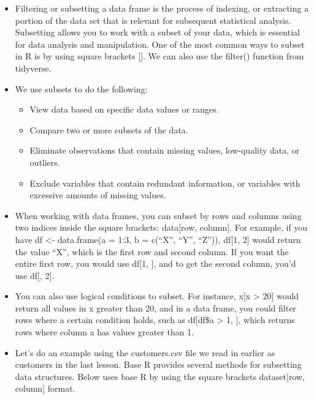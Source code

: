 \documentclass[
  letterpaper,
  DIV=11,
  numbers=noendperiod]{scrreprt}
\providecommand{\tightlist}{%
  \setlength{\itemsep}{0pt}\setlength{\parskip}{0pt}}\usepackage{longtable,booktabs,array}
\begin{document}
\begin{itemize}
\item
  Filtering or subsetting a data frame is the process of indexing, or
  extracting a portion of the data set that is relevant for subsequent
  statistical analysis. Subsetting allows you to work with a subset of
  your data, which is essential for data analysis and manipulation. One
  of the most common ways to subset in R is by using square brackets
  {[}{]}. We can also use the filter() function from tidyverse.
\item
  We use subsets to do the following:

  \begin{itemize}
  \tightlist
  \item
    View data based on specific data values or ranges.
  \item
    Compare two or more subsets of the data.
  \item
    Eliminate observations that contain missing values, low-quality
    data, or outliers.
  \item
    Exclude variables that contain redundant information, or variables
    with excessive amounts of missing values.
  \end{itemize}
\item
  When working with data frames, you can subset by rows and columns
  using two indices inside the square brackets: data{[}row, column{]}.
  For example, if you have df \textless- data.frame(a = 1:3, b =
  c(``X'', ``Y'', ``Z'')), df{[}1, 2{]} would return the value ``X'',
  which is the first row and second column. If you want the entire first
  row, you would use df{[}1, {]}, and to get the second column, you'd
  use df{[}, 2{]}.
\item
  You can also use logical conditions to subset. For instance, x{[}x
  \textgreater{} 20{]} would return all values in x greater than 20, and
  in a data frame, you could filter rows where a certain condition
  holds, such as df{[}df\$a \textgreater{} 1, {]}, which returns rows
  where column a has values greater than 1.
\item
  Let's do an example using the customers.csv file we read in earlier as
  customers in the last lesson. Base R provides several methods for
  subsetting data structures. Below uses base R by using the square
  brackets dataset{[}row, column{]} format.
\end{itemize}
\end{document}
